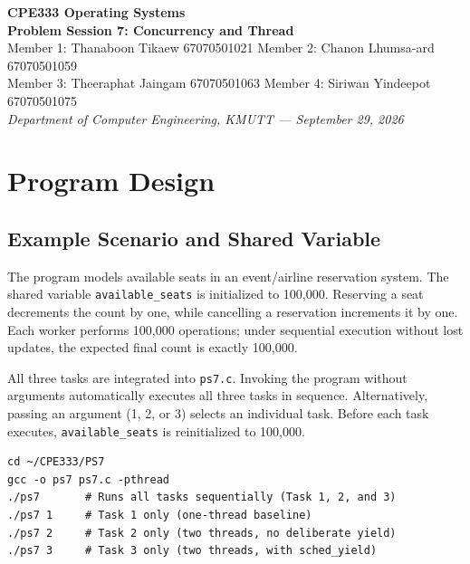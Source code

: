 \documentclass[a4paper,10pt]{article}
\begin{document}
\begin{center}
  {\Large \textbf{CPE333 Operating Systems}}\\[3pt]
  {\large \textbf{Problem Session 7: Concurrency and Thread}}\\[6pt]
  \small
  Member 1: Thanaboon Tikaew 67070501021 \quad
  Member 2: Chanon Lhumsa-ard 67070501059 \\[2pt]
  Member 3: Theeraphat Jaingam 67070501063 \quad
  Member 4: Siriwan Yindeepot 67070501075 \\[4pt]
  \textit{Department of Computer Engineering, KMUTT --- September 29, 2026}
\end{center}

\vspace{-4pt}
\begin{center}
\end{center}
\vspace{-4pt}

\section{Program Design}
\subsection{Example Scenario and Shared Variable}
The program models available seats in an event/airline reservation system. The shared variable \texttt{available\_seats} is initialized to 100,000. Reserving a seat decrements the count by one, while cancelling a reservation increments it by one. Each worker performs 100,000 operations; under sequential execution without lost updates, the expected final count is exactly 100,000.

All three tasks are integrated into \texttt{ps7.c}. Invoking the program without arguments automatically executes all three tasks in sequence. Alternatively, passing an argument (1, 2, or 3) selects an individual task. Before each task executes, \texttt{available\_seats} is reinitialized to 100,000.

\begin{lstlisting}[basicstyle=\ttfamily\scriptsize]
cd ~/CPE333/PS7
gcc -o ps7 ps7.c -pthread
./ps7       # Runs all tasks sequentially (Task 1, 2, and 3)
./ps7 1     # Task 1 only (one-thread baseline)
./ps7 2     # Task 2 only (two threads, no deliberate yield)
./ps7 3     # Task 3 only (two threads, with sched_yield)
\end{lstlisting}
\end{document}
